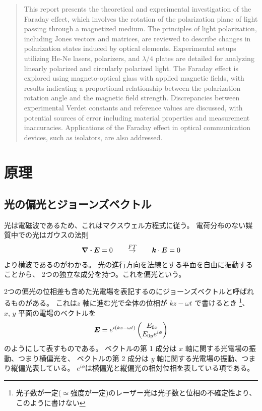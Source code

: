 \documentclass[9pt,dvipdfmx,a4paper]{jsarticle}
\begin{document}

\begin{abstract}
    This report presents the theoretical and experimental investigation of the Faraday effect,
    which involves the rotation of the polarization plane of light passing through a magnetized medium.
    The principles of light polarization, including Jones vectors and matrices,
    are reviewed to describe changes in polarization states induced by optical elements.
    Experimental setups utilizing He-Ne lasers, polarizers,
    and \(\lambda/4\) plates are detailed for analyzing linearly polarized and circularly polarized light.
    The Faraday effect is explored using magneto-optical glass with applied magnetic fields,
    with results indicating a proportional relationship between the polarization rotation angle
    and the magnetic field strength. Discrepancies between experimental Verdet constants and reference values are discussed,
    with potential sources of error including material properties and measurement inaccuracies.
    Applications of the Faraday effect in optical communication devices, such as isolators, are also addressed.
\end{abstract}


\section{原理}
\subsection{光の偏光とジョーンズベクトル}
光は電磁波であるため、これはマクスウェル方程式に従う。
電荷分布のない媒質中での光はガウスの法則
\begin{align}
    \div{\vb*{E}} = 0 \overset{FT}{\qquad\rightarrow\qquad} \vb*{k}\cdot \vb*{E} = 0
\end{align}
より横波であるのがわかる。
光の進行方向を法線とする平面を自由に振動することから、
2つの独立な成分を持つ。これを偏光という。

2つの偏光の位相差も含めた光電場を表記するのにジョーンズベクトルと呼ばれるものがある。
これは\(z\) 軸に進む光で全体の位相が \(kz-\omega t\) で書けるとき
\footnote{光子数が一定(\(\simeq\)強度が一定)のレーザー光は光子数と位相の不確定性より、このように書けない}、
\(x,\,y\) 平面の電場のベクトルを
\begin{align}
    \vb*{E} = e^{i(kz-\omega t)}
    \begin{pmatrix}
        E_{0x}\\ E_{0y}e^{i\phi}
    \end{pmatrix}
\end{align}
のようにして表すものである。
ベクトルの第 1 成分は \(x\) 軸に関する光電場の振動、つまり横偏光を、
ベクトルの第 2 成分は \(y\) 軸に関する光電場の振動、つまり縦偏光表している。
\(e^{i\phi}\)は横偏光と縦偏光の相対位相を表している項である。
\end{document}
